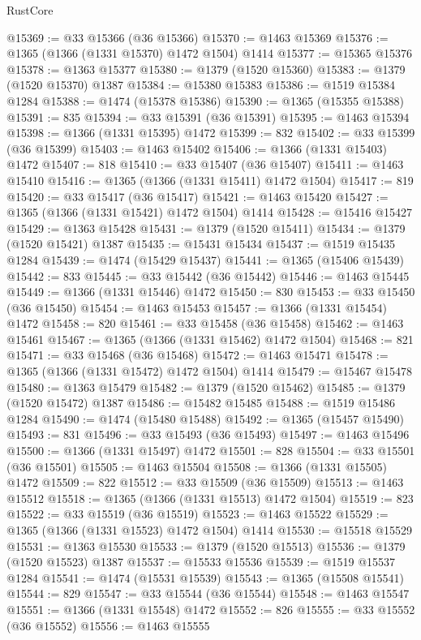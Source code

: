 \begin{lexlean}{RustCore}
\begin{coremodule}
@15369 := @33 @15366 (@36 @15366)
@15370 := @1463 @15369
@15376 := @1365 (@1366 (@1331 @15370) @1472 @1504) @1414
@15377 := @15365 @15376
@15378 := @1363 @15377
@15380 := @1379 (@1520 @15360)
@15383 := @1379 (@1520 @15370) @1387
@15384 := @15380 @15383
@15386 := @1519 @15384 @1284
@15388 := @1474 (@15378 @15386)
@15390 := @1365 (@15355 @15388)
@15391 := 835
@15394 := @33 @15391 (@36 @15391)
@15395 := @1463 @15394
@15398 := @1366 (@1331 @15395) @1472
@15399 := 832
@15402 := @33 @15399 (@36 @15399)
@15403 := @1463 @15402
@15406 := @1366 (@1331 @15403) @1472
@15407 := 818
@15410 := @33 @15407 (@36 @15407)
@15411 := @1463 @15410
@15416 := @1365 (@1366 (@1331 @15411) @1472 @1504)
@15417 := 819
@15420 := @33 @15417 (@36 @15417)
@15421 := @1463 @15420
@15427 := @1365 (@1366 (@1331 @15421) @1472 @1504) @1414
@15428 := @15416 @15427
@15429 := @1363 @15428
@15431 := @1379 (@1520 @15411)
@15434 := @1379 (@1520 @15421) @1387
@15435 := @15431 @15434
@15437 := @1519 @15435 @1284
@15439 := @1474 (@15429 @15437)
@15441 := @1365 (@15406 @15439)
@15442 := 833
@15445 := @33 @15442 (@36 @15442)
@15446 := @1463 @15445
@15449 := @1366 (@1331 @15446) @1472
@15450 := 830
@15453 := @33 @15450 (@36 @15450)
@15454 := @1463 @15453
@15457 := @1366 (@1331 @15454) @1472
@15458 := 820
@15461 := @33 @15458 (@36 @15458)
@15462 := @1463 @15461
@15467 := @1365 (@1366 (@1331 @15462) @1472 @1504)
@15468 := 821
@15471 := @33 @15468 (@36 @15468)
@15472 := @1463 @15471
@15478 := @1365 (@1366 (@1331 @15472) @1472 @1504) @1414
@15479 := @15467 @15478
@15480 := @1363 @15479
@15482 := @1379 (@1520 @15462)
@15485 := @1379 (@1520 @15472) @1387
@15486 := @15482 @15485
@15488 := @1519 @15486 @1284
@15490 := @1474 (@15480 @15488)
@15492 := @1365 (@15457 @15490)
@15493 := 831
@15496 := @33 @15493 (@36 @15493)
@15497 := @1463 @15496
@15500 := @1366 (@1331 @15497) @1472
@15501 := 828
@15504 := @33 @15501 (@36 @15501)
@15505 := @1463 @15504
@15508 := @1366 (@1331 @15505) @1472
@15509 := 822
@15512 := @33 @15509 (@36 @15509)
@15513 := @1463 @15512
@15518 := @1365 (@1366 (@1331 @15513) @1472 @1504)
@15519 := 823
@15522 := @33 @15519 (@36 @15519)
@15523 := @1463 @15522
@15529 := @1365 (@1366 (@1331 @15523) @1472 @1504) @1414
@15530 := @15518 @15529
@15531 := @1363 @15530
@15533 := @1379 (@1520 @15513)
@15536 := @1379 (@1520 @15523) @1387
@15537 := @15533 @15536
@15539 := @1519 @15537 @1284
@15541 := @1474 (@15531 @15539)
@15543 := @1365 (@15508 @15541)
@15544 := 829
@15547 := @33 @15544 (@36 @15544)
@15548 := @1463 @15547
@15551 := @1366 (@1331 @15548) @1472
@15552 := 826
@15555 := @33 @15552 (@36 @15552)
@15556 := @1463 @15555

\end{coremodule}
\end{lexlean}
